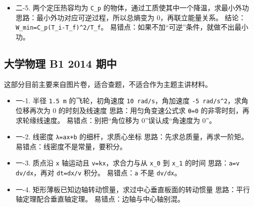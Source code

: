 \documentclass[12pt,a4paper]{ctexart}
\begin{document}
\begin{itemize}

\item 二-5. 两个定压热容均为 \texttt{C\_p} 的物体，通过工质使其中一个降温，求最小外功 思路：最小外功对应可逆过程，所以总熵变为 0，再联立能量关系。 结论：\texttt{W\_min=C\_p(T\_i-T\_f)\textasciicircum{}2/T\_f}。 易错点：如果不加“可逆”条件，就做不出最小功。

\end{itemize}

\subsection{大学物理 B1 2014 期中}

这部分目前主要来自图片卷，适合查题，不适合作为主题主讲材料。

\begin{itemize}

\item 一-1. 半径 \texttt{1.5 m} 的飞轮，初角速度 \texttt{10 rad/s}，角加速度 \texttt{-5 rad/s\textasciicircum{}2}，求角位移再次为 0 的时刻及线速度 思路：用匀角变速公式求 \texttt{θ=0} 的非零时刻，再求轮缘线速度。 易错点：别把“角位移为 0”误认成“角速度为 0”。

\end{itemize}

\begin{itemize}

\item 一-2. 线密度 \texttt{λ=ax+b} 的细杆，求质心坐标 思路：先求总质量，再求一阶矩。 易错点：线密度不是常量，要积分。

\end{itemize}

\begin{itemize}

\item 一-3. 质点沿 \texttt{x} 轴运动且 \texttt{v=kx}，求合力与从 \texttt{x\_0} 到 \texttt{x\_1} 的时间 思路：\texttt{a=v dv/dx}，再对 \texttt{dt=dx/v} 积分。 易错点：\texttt{a} 不是 \texttt{dv/dx}。

\end{itemize}

\begin{itemize}

\item 一-4. 矩形薄板已知边轴转动惯量，求过中心垂直板面的转动惯量 思路：平行轴定理配合垂直轴定理。 易错点：边轴与中心轴别混。

\end{itemize}
\end{document}
